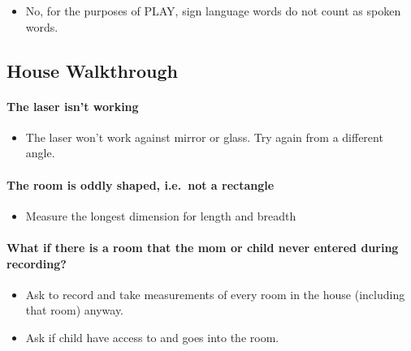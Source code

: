 \documentclass[
  12pt,
]{book}
\providecommand{\tightlist}{%
  \setlength{\itemsep}{0pt}\setlength{\parskip}{0pt}}
\begin{document}
\begin{itemize}
\tightlist
\item
  No, for the purposes of PLAY, sign language words do not count as spoken words.
\end{itemize}

\hypertarget{faqs_walkthrough}{%
\subsection{House Walkthrough}\label{faqs_walkthrough}}

\hypertarget{the-laser-isnt-working}{%
\paragraph*{The laser isn't working}\label{the-laser-isnt-working}}

\begin{itemize}
\tightlist
\item
  The laser won't work against mirror or glass. Try again from a different angle.
\end{itemize}

\hypertarget{the-room-is-oddly-shaped-i.e.-not-a-rectangle}{%
\paragraph*{The room is oddly shaped, i.e.~not a rectangle}\label{the-room-is-oddly-shaped-i.e.-not-a-rectangle}}

\begin{itemize}
\tightlist
\item
  Measure the longest dimension for length and breadth
\end{itemize}

\hypertarget{what-if-there-is-a-room-that-the-mom-or-child-never-entered-during-recording}{%
\paragraph*{What if there is a room that the mom or child never entered during recording?}\label{what-if-there-is-a-room-that-the-mom-or-child-never-entered-during-recording}}

\begin{itemize}
\tightlist
\item
  Ask to record and take measurements of every room in the house (including that room) anyway.
\item
  Ask if child have access to and goes into the room.
\end{itemize}
\end{document}
